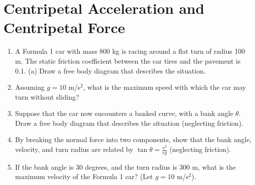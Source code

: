 \documentclass[10pt]{article}
\begin{document}
\section{Centripetal Acceleration and Centripetal Force}
\begin{enumerate}
\item A Formula 1 car with mass 800 kg is racing around a flat turn of radius 100 m.  The static friction coefficient between the car tires and the pavement is 0.1.  (a) Draw a free body diagram that describes the situation. \\ \vspace{2cm}
\item Assuming $g = 10$ m/s$^2$, what is the maximum speed with which the car may turn without sliding? \\ \vspace{2cm} 
\item Suppose that the car now encounters a banked curve, with a bank angle $\theta$.  Draw a free body diagram that describes the situation (neglecting friction). \\ \vspace{2cm}
\item By breaking the normal force into two components, show that the bank angle, velocity, and turn radius are related by $\tan\theta = \frac{v^2}{rg}$ (neglecting friction). \\ \vspace{2cm}
\item If the bank angle is 30 degrees, and the turn radius is 300 m, what is the maximum velocity of the Formula 1 car?  (Let $g = 10$ m/s$^2$). \\ \vspace{2cm}
\end{enumerate}
\end{document}
